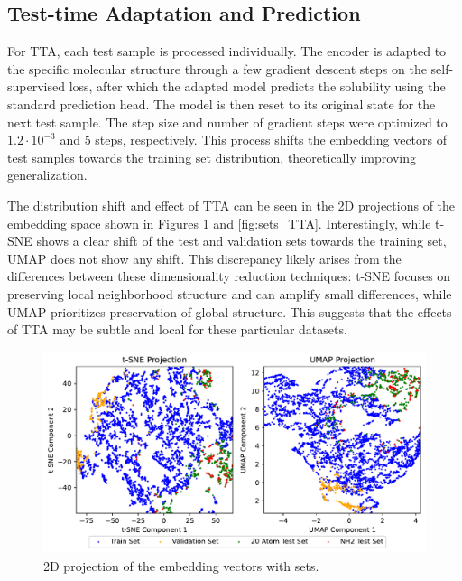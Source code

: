 \documentclass[11pt,a4paper]{article}
\begin{document}
\subsection{Test-time Adaptation and Prediction}

For TTA, each test sample is processed individually. The encoder is adapted to the specific molecular structure through a few gradient descent steps on the self-supervised loss, after which the adapted model predicts the solubility using the standard prediction head. The model is then reset to its original state for the next test sample. The step size and number of gradient steps were optimized to $1.2 \cdot 10^{-3}$ and 5 steps, respectively. This process shifts the embedding vectors of test samples towards the training set distribution, theoretically improving generalization.

The distribution shift and effect of TTA can be seen in the 2D projections of the embedding space shown in Figures \ref{fig:sets} and \ref{fig:sets_TTA}. Interestingly, while t-SNE shows a clear shift of the test and validation sets towards the training set, UMAP does not show any shift. This discrepancy likely arises from the differences between these dimensionality reduction techniques: t-SNE focuses on preserving local neighborhood structure and can amplify small differences, while UMAP prioritizes preservation of global structure. This suggests that the effects of TTA may be subtle and local for these particular datasets.

\begin{figure}[htbp]
        \centering
        \includegraphics[width=1\textwidth]{sets.pdf}
        \caption{2D projection of the embedding vectors with sets.}
        \label{fig:sets}
\end{figure}
\end{document}

